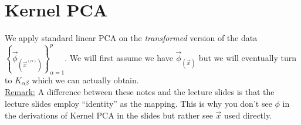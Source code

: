 \section{Kernel PCA}

We apply standard linear PCA on the \emph{transformed} version of the data
$
\left\{
\vec{\phi}_{(\vec{x}^{(\alpha)})}
\right\}_{\alpha=1}^{p}
$.
We will first assume we have $\vec{\phi}_{(\vec{x})}$ 
but we will eventually turn to $K_{\alpha \beta}$ 
which we can actually obtain.\\

\underline{Remark:}
A difference between these notes and the lecture slides is that 
the lecture slides employ ``identity'' as the mapping. 
This is why you don't see $\phi$ in the derivations of Kernel PCA in the slides but rather see $\vec x$ used directly.\\


